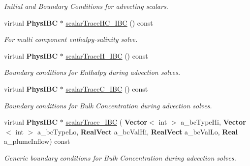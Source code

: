 \begin{DoxyCompactItemize}
\begin{DoxyCompactList}\small\item\em Initial and Boundary Conditions for advecting scalars. \end{DoxyCompactList}\item 
\mbox{\label{class_phys_b_c_util_a757d098a45d192eb056f20c39a8bf0b4}} 
virtual \textbf{ Phys\+I\+BC} $\ast$ \hyperlink{class_phys_b_c_util_a757d098a45d192eb056f20c39a8bf0b4}{scalar\+Trace\+H\+C\+\_\+\+I\+BC} () const
\begin{DoxyCompactList}\small\item\em For multi component enthalpy-\/salinity solve. \end{DoxyCompactList}\item 
\mbox{\label{class_phys_b_c_util_aec2445f00529a64f933a8f94857510b1}} 
virtual \textbf{ Phys\+I\+BC} $\ast$ \hyperlink{class_phys_b_c_util_aec2445f00529a64f933a8f94857510b1}{scalar\+Trace\+H\+\_\+\+I\+BC} () const
\begin{DoxyCompactList}\small\item\em Boundary conditions for Enthalpy during advection solves. \end{DoxyCompactList}\item 
\mbox{\label{class_phys_b_c_util_a5c909f1431b5b8546a64b4a179af3136}} 
virtual \textbf{ Phys\+I\+BC} $\ast$ \hyperlink{class_phys_b_c_util_a5c909f1431b5b8546a64b4a179af3136}{scalar\+Trace\+C\+\_\+\+I\+BC} () const
\begin{DoxyCompactList}\small\item\em Boundary conditions for Bulk Concentration during advection solves. \end{DoxyCompactList}\item 
\mbox{\label{class_phys_b_c_util_aac4a0e01f79105a8d8a8a1ee6af582d7}} 
virtual \textbf{ Phys\+I\+BC} $\ast$ \hyperlink{class_phys_b_c_util_aac4a0e01f79105a8d8a8a1ee6af582d7}{scalar\+Trace\+\_\+\+I\+BC} (\textbf{ Vector}$<$ int $>$ a\+\_\+bc\+Type\+Hi, \textbf{ Vector}$<$ int $>$ a\+\_\+bc\+Type\+Lo, \textbf{ Real\+Vect} a\+\_\+bc\+Val\+Hi, \textbf{ Real\+Vect} a\+\_\+bc\+Val\+Lo, \textbf{ Real} a\+\_\+plume\+Inflow) const
\begin{DoxyCompactList}\small\item\em Generic boundary conditions for Bulk Concentration during advection solves. \end{DoxyCompactList}\item 

\end{DoxyCompactItemize}

